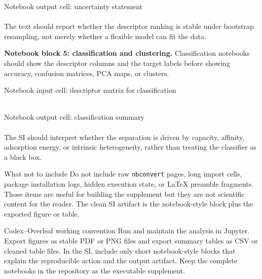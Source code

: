 \documentclass[journal=jacsat,manuscript=article]{achemso}
\begin{document}
\begin{greenbox}{Notebook output cell: uncertainty statement}
\small
\noindent\texttt{}\\
\texttt{}\\
The text should report whether the descriptor ranking is stable under bootstrap
resampling, not merely whether a flexible model can fit the data.
\end{greenbox}

\noindent\textbf{Notebook block 5: classification and clustering.}
Classification notebooks should show the descriptor columns and the target
labels before showing accuracy, confusion matrices, PCA maps, or clusters.

\begin{bluebox}{Notebook input cell: descriptor matrix for classification}
\small
\noindent\texttt{}\\
\texttt{}\\
\texttt{}
\end{bluebox}

\begin{greenbox}{Notebook output cell: classification summary}
\small
\noindent\texttt{}\\
\texttt{}\\
The SI should interpret whether the separation is driven by capacity, affinity,
adsorption energy, or intrinsic heterogeneity, rather than treating the
classifier as a black box.
\end{greenbox}

\begin{redbox}{What not to include}
	Do not include raw \texttt{nbconvert} pages, long import cells, package
	installation logs, hidden execution state, or LaTeX preamble fragments. Those
	items are useful for building the supplement but they are not scientific
	content for the reader. The clean SI artifact is the notebook-style block plus
	the exported figure or table.
\end{redbox}

\begin{bluebox}{Codex--Overleaf working convention}
	Run and maintain the analysis in Jupyter. Export figures as stable PDF or PNG
	files and export summary tables as CSV or cleaned table files. In the SI,
	include only short notebook-style blocks that explain the reproducible action
	and the output artifact. Keep the complete notebooks in the repository as the
	executable supplement.
\end{bluebox}
\end{document}

